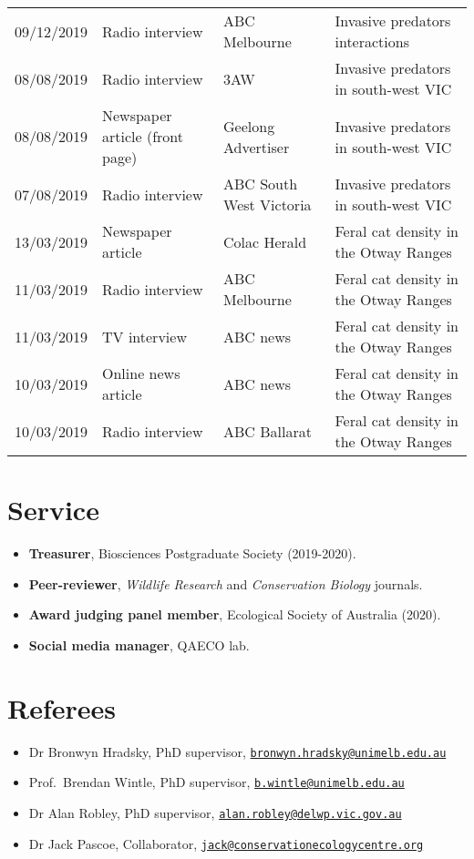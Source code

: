 \documentclass[10pt,a4paper,]{article}
\providecommand{\tightlist}{%
  \setlength{\itemsep}{0pt}\setlength{\parskip}{0pt}}
\begin{document}
\begin{tabular}{llll}
  09/12/2019 & Radio interview & ABC Melbourne & Invasive predators interactions \\ 
  08/08/2019 & Radio interview & 3AW & Invasive predators in south-west VIC \\ 
  08/08/2019 & Newspaper article (front page) & Geelong Advertiser & Invasive predators in south-west VIC \\ 
  07/08/2019 & Radio interview & ABC South West Victoria & Invasive predators in south-west VIC \\ 
  13/03/2019 & Newspaper article & Colac Herald & Feral cat density in the Otway Ranges \\ 
  11/03/2019 & Radio interview & ABC Melbourne & Feral cat density in the Otway Ranges \\ 
  11/03/2019 & TV interview & ABC news & Feral cat density in the Otway Ranges \\ 
  10/03/2019 & Online news article & ABC news & Feral cat density in the Otway Ranges \\ 
  10/03/2019 & Radio interview & ABC Ballarat & Feral cat density in the Otway Ranges \\ 
  \end{tabular}

\hypertarget{service}{%
\section{Service}\label{service}}

\begin{itemize}
\tightlist
\item
  \textbf{Treasurer}, Biosciences Postgraduate Society (2019-2020).
\item
  \textbf{Peer-reviewer}, \emph{Wildlife Research} and \emph{Conservation Biology} journals.
\item
  \textbf{Award judging panel member}, Ecological Society of Australia (2020).
\item
  \textbf{Social media manager}, QAECO lab.
\end{itemize}

\hypertarget{referees}{%
\section{Referees}\label{referees}}

\begin{itemize}
\tightlist
\item
  Dr Bronwyn Hradsky, PhD supervisor, \href{mailto:bronwyn.hradsky@unimelb.edu.au}{\nolinkurl{bronwyn.hradsky@unimelb.edu.au}}
\item
  Prof.~Brendan Wintle, PhD supervisor, \href{mailto:b.wintle@unimelb.edu.au}{\nolinkurl{b.wintle@unimelb.edu.au}}
\item
  Dr Alan Robley, PhD supervisor, \href{mailto:alan.robley@delwp.vic.gov.au}{\nolinkurl{alan.robley@delwp.vic.gov.au}}
\item
  Dr Jack Pascoe, Collaborator, \href{mailto:jack@conservationecologycentre.org}{\nolinkurl{jack@conservationecologycentre.org}}
\end{itemize}
\end{document}
